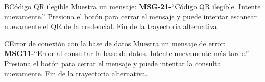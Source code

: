 \begin{UCtrayectoriaA}{B}{Código QR ilegible}
	\UCpaso  Muestra un mensaje: {\bf MSG-21-}{``Código QR ilegible. Intente nuevamente.''}
	\UCpaso[\UCactor] Presiona el botón  para cerrar el mensaje y puede intentar escanear nuevamente el QR de la credencial.
	\UCpaso Fin de la trayectoria alternativa.
\end{UCtrayectoriaA}

\begin{UCtrayectoriaA}{C}{Error de conexión con la base de datos}
	\UCpaso Muestra un mensaje de error: {\bf MSG11-}{``Error al consultar la base de datos. Intente nuevamente más tarde.''}
	\UCpaso[\UCactor] Presiona el botón  para cerrar el mensaje y puede intentar la consulta nuevamente.
	\UCpaso Fin de la trayectoria alternativa.
\end{UCtrayectoriaA}

